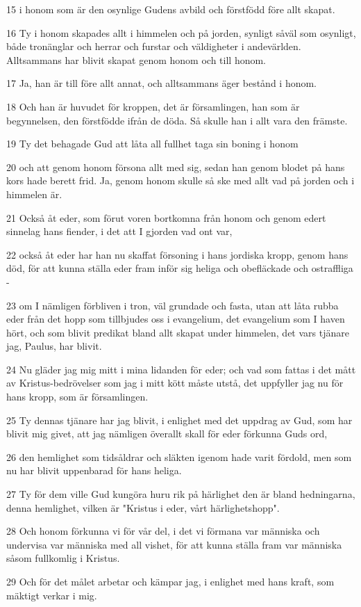 \par 15 i honom som är den osynlige Gudens avbild och förstfödd före allt skapat.
\par 16 Ty i honom skapades allt i himmelen och på jorden, synligt såväl som osynligt, både tronänglar och herrar och furstar och väldigheter i andevärlden. Alltsammans har blivit skapat genom honom och till honom.
\par 17 Ja, han är till före allt annat, och alltsammans äger bestånd i honom.
\par 18 Och han är huvudet för kroppen, det är församlingen, han som är begynnelsen, den förstfödde ifrån de döda. Så skulle han i allt vara den främste.
\par 19 Ty det behagade Gud att låta all fullhet taga sin boning i honom
\par 20 och att genom honom försona allt med sig, sedan han genom blodet på hans kors hade berett frid. Ja, genom honom skulle så ske med allt vad på jorden och i himmelen är.
\par 21 Också åt eder, som förut voren bortkomna från honom och genom edert sinnelag hans fiender, i det att I gjorden vad ont var,
\par 22 också åt eder har han nu skaffat försoning i hans jordiska kropp, genom hans död, för att kunna ställa eder fram inför sig heliga och obefläckade och ostraffliga -
\par 23 om I nämligen förbliven i tron, väl grundade och fasta, utan att låta rubba eder från det hopp som tillbjudes oss i evangelium, det evangelium som I haven hört, och som blivit predikat bland allt skapat under himmelen, det vars tjänare jag, Paulus, har blivit.
\par 24 Nu gläder jag mig mitt i mina lidanden för eder; och vad som fattas i det mått av Kristus-bedrövelser som jag i mitt kött måste utstå, det uppfyller jag nu för hans kropp, som är församlingen.
\par 25 Ty dennas tjänare har jag blivit, i enlighet med det uppdrag av Gud, som har blivit mig givet, att jag nämligen överallt skall för eder förkunna Guds ord,
\par 26 den hemlighet som tidsåldrar och släkten igenom hade varit fördold, men som nu har blivit uppenbarad för hans heliga.
\par 27 Ty för dem ville Gud kungöra huru rik på härlighet den är bland hedningarna, denna hemlighet, vilken är "Kristus i eder, vårt härlighetshopp".
\par 28 Och honom förkunna vi för vår del, i det vi förmana var människa och undervisa var människa med all vishet, för att kunna ställa fram var människa såsom fullkomlig i Kristus.
\par 29 Och för det målet arbetar och kämpar jag, i enlighet med hans kraft, som mäktigt verkar i mig.

